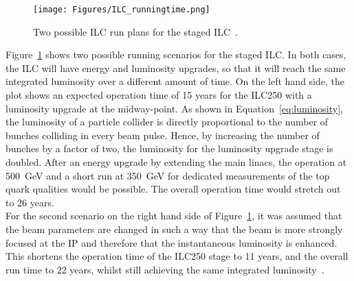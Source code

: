 \begin{figure}
\centering
\texttt{[image: Figures/ILC\_runningtime.png]}
\caption[ILC run plan]{Two possible ILC run plans for the staged ILC~\cite[p. 8]{PhysicsCase}.}
\label{fig:ILC_runningtime}
\end{figure}
Figure~\ref{fig:ILC_runningtime} shows two possible running scenarios for the staged ILC.
In both cases, the ILC will have energy and luminosity upgrades, so that it will reach the same integrated luminosity over a different amount of time.
On the left hand side, the plot shows an expected operation time of 15 years for the ILC250 with a luminosity upgrade at the midway-point.
As shown in Equation~\ref{eq:luminosity}, the luminosity of a particle collider is directly proportional to the number of bunches colliding in every beam pulse.
Hence, by increasing the number of bunches by a factor of two, the luminosity for the luminosity upgrade stage is doubled.
After an energy upgrade by extending the main linacs, the operation at \SI{500}{\GeV} and a short run at \SI{350}{\GeV} for dedicated measurements of the top quark qualities would be possible.
The overall operation time would stretch out to 26 years.\\
For the second scenario on the right hand side of Figure~\ref{fig:ILC_runningtime}, it was assumed that the beam parameters are changed in such a way that the beam is more strongly focused at the IP and therefore that the instantaneous luminosity is enhanced.
This shortens the operation time of the ILC250 stage to 11 years, and the overall run time to 22 years, whilst still achieving the same integrated luminosity~\cite[p. 7]{PhysicsCase}.


